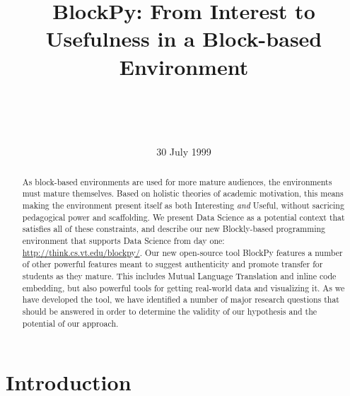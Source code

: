 \documentclass{sig-alternate}
\begin{document}
%
\title{BlockPy: From Interest to Usefulness in a Block-based Environment}
\author{
	\\
	\\
	  \\
}
\date{30 July 1999}

\maketitle
\begin{abstract}
As block-based environments are used for more mature audiences, the environments must mature themselves.
Based on holistic theories of academic motivation, this means making the environment present itself as both Interesting \textit{and} Useful, without sacricing pedagogical power and scaffolding.
We present Data Science as a potential context that satisfies all of these constraints, and describe our new Blockly-based programming environment that supports Data Science from day one: \url{http://think.cs.vt.edu/blockpy/}.
Our new open-source tool BlockPy features a number of other powerful features meant to suggest authenticity and promote transfer for students as they mature.
This includes Mutual Language Translation and inline code embedding, but also powerful tools for getting real-world data and visualizing it.
As we have developed the tool, we have identified a number of major research questions that should be answered in order to determine the validity of our hypothesis and the potential of our approach.
\end{abstract}





\section{Introduction}
\end{document}
